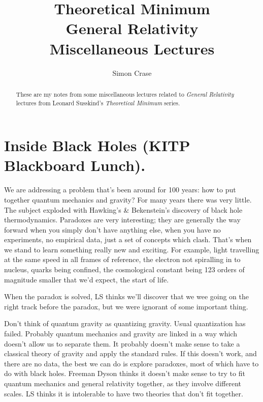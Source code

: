 \documentclass[]{article}
\title{Theoretical Minimum\\General Relativity\\Miscellaneous Lectures}
\author{Simon Crase}
\begin{document}
	
\maketitle
	
\begin{abstract}
	These are my notes from some miscellaneous lectures related to  \emph{General Relativity}\cite{susskind2012general} lectures from Leonard Susskind's \emph{Theoretical Minimum} series\cite{susskind2007theoretical}.
\end{abstract}
	
\tableofcontents
\listoffigures
\listoftables
\listoftheorems

\section{Inside Black Holes (KITP Blackboard Lunch).}\label{sec:inh}

We are addressing a problem that's been around for 100 years: how to put together quantum mechanics and gravity?  For many years there was very little. The subject exploded with Hawking's \& Bekenstein's discovery of black hole thermodynamics. Paradoxes are very interesting; they are generally the way forward when you simply don't have anything else, when you have no experiments, no empirical data, just a set of concepts which clash. That's when we stand to learn something really new and exciting. For example, light travelling at the same speed in all frames of reference, the electron not spiralling in to nucleus, quarks being confined, the cosmological constant being 123 orders of magnitude smaller that we'd expect, the start of life.\cite{susskind2013inside}

When the paradox is solved, LS thinks we'll discover that we wee going on the right track before the paradox, but we were ignorant of some important thing.

Don't think of quantum gravity as quantizing gravity. Usual quantization has failed. Probably quantum mechanics and gravity are linked in a way which doesn't allow us to separate them. It probably doesn't make sense to take a classical theory of gravity and apply the standard rules. If this doesn't work, and there are no data, the best we can do is explore paradoxes, most of which have to do with black holes. Freeman Dyson thinks it doesn't make sense to try to fit quantum mechanics and general relativity together, as they involve different scales. LS thinks it is intolerable to have two theories that don't fit together. 
\end{document}
